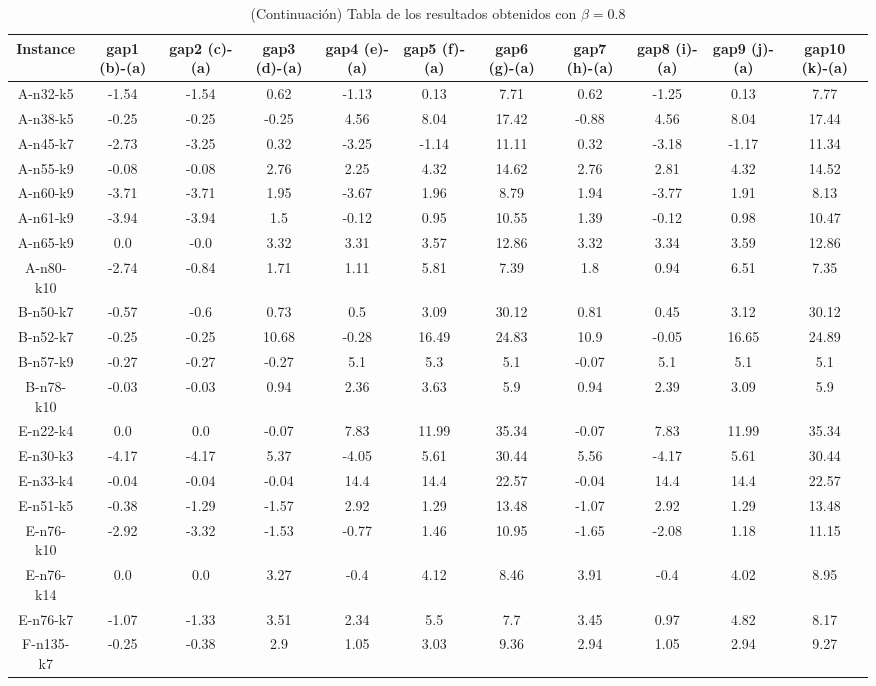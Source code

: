 \documentclass[11pt]{article} %
\begin{document}
\begin{enumerate}
\begin{landscape}
\begin{table}[p]
\centering
\begin{small}
\caption{(Continuación) Tabla de los resultados obtenidos con $\beta = 0.8$}
\begin{tabular}{ccccccccccc}
\toprule
Instance & gap1 (b)-(a) &          gap2 (c)-(a) &       gap3 (d)-(a) &       gap4 (e)-(a) &       gap5 (f)-(a) &       gap6 (g)-(a) &       gap7 (h)-(a) &       gap8 (i)-(a) &       gap9 (j)-(a) &      gap10 (k)-(a) \\
\midrule
A-n32-k5&-1.54&-1.54&0.62&-1.13&0.13&7.71&0.62&-1.25&0.13&7.77\\
A-n38-k5&-0.25&-0.25&-0.25&4.56&8.04&17.42&-0.88&4.56&8.04&17.44\\
A-n45-k7&-2.73&-3.25&0.32&-3.25&-1.14&11.11&0.32&-3.18&-1.17&11.34\\
A-n55-k9&-0.08&-0.08&2.76&2.25&4.32&14.62&2.76&2.81&4.32&14.52\\
A-n60-k9&-3.71&-3.71&1.95&-3.67&1.96&8.79&1.94&-3.77&1.91&8.13\\
A-n61-k9&-3.94&-3.94&1.5&-0.12&0.95&10.55&1.39&-0.12&0.98&10.47\\
A-n65-k9&0.0&-0.0&3.32&3.31&3.57&12.86&3.32&3.34&3.59&12.86\\
A-n80-k10&-2.74&-0.84&1.71&1.11&5.81&7.39&1.8&0.94&6.51&7.35\\
B-n50-k7&-0.57&-0.6&0.73&0.5&3.09&30.12&0.81&0.45&3.12&30.12\\
B-n52-k7&-0.25&-0.25&10.68&-0.28&16.49&24.83&10.9&-0.05&16.65&24.89\\
B-n57-k9&-0.27&-0.27&-0.27&5.1&5.3&5.1&-0.07&5.1&5.1&5.1\\
B-n78-k10&-0.03&-0.03&0.94&2.36&3.63&5.9&0.94&2.39&3.09&5.9\\
E-n22-k4&0.0&0.0&-0.07&7.83&11.99&35.34&-0.07&7.83&11.99&35.34\\
E-n30-k3&-4.17&-4.17&5.37&-4.05&5.61&30.44&5.56&-4.17&5.61&30.44\\
E-n33-k4&-0.04&-0.04&-0.04&14.4&14.4&22.57&-0.04&14.4&14.4&22.57\\
E-n51-k5&-0.38&-1.29&-1.57&2.92&1.29&13.48&-1.07&2.92&1.29&13.48\\
E-n76-k10&-2.92&-3.32&-1.53&-0.77&1.46&10.95&-1.65&-2.08&1.18&11.15\\
E-n76-k14&0.0&0.0&3.27&-0.4&4.12&8.46&3.91&-0.4&4.02&8.95\\
E-n76-k7&-1.07&-1.33&3.51&2.34&5.5&7.7&3.45&0.97&4.82&8.17\\
F-n135-k7&-0.25&-0.38&2.9&1.05&3.03&9.36&2.94&1.05&2.94&9.27\\

\end{tabular}
\end{small}
\end{table}
\end{landscape}
\end{enumerate}
\end{document}
